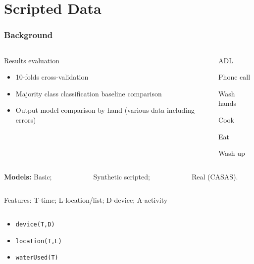 \documentclass[10pt]{beamer}
\begin{document}
\section{Scripted Data}

\begin{frame}
  \frametitle{Background}

  \begin{columns}
    \begin{column}{8cm}
      \begin{block}{Results evaluation}
      \begin{itemize}
        \item 10-folds cross-validation
        \item Majority class classification baseline comparison
        \item Output model comparison by hand (various data including errors)
      \end{itemize}
      \end{block}
    \end{column}

    \begin{column}{3cm}
      \begin{block}{ADL}
      \begin{itemize}
        \item Phone call
        \item Wash hands
        \item Cook {\setlength{\itemindent}{4em}\vspace*{-1.5em}\item Eat}
        \item Wash up
      \end{itemize}
      \end{block}
    \end{column}
  \end{columns}

\vspace*{0.5em}\textbf{Models:} Basic;~~~~~~~~~~~~Synthetic scripted;~~~~~~~~~~~~Real (CASAS).

  \begin{columns}

    \begin{column}{8cm}
      \begin{block}{Features: T-time; L-location/list; D-device; A-activity}

      \begin{columns}
        \hspace*{2em}\begin{column}{4cm}
        \begin{itemize}
          \item \texttt{device(T,D)}
          \item \texttt{location(T,L)}
          \item \texttt{waterUsed(T)}


\end{itemize}
\end{column}
\end{columns}
\end{block}
\end{column}
\end{columns}
\end{frame}
\end{document}
